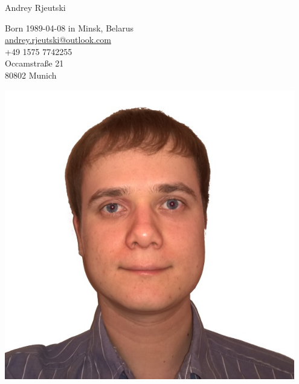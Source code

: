 \documentclass[a4paper,11pt]{article}
\makeatletter
\newcommand{\myemail}{andrey.rjeutski@outlook.com}
\newcommand{\minsk}{Minsk, Belarus}
\makeatother
\begin{document}
  \begin{minipage}{0.69\textwidth}
    \begin{centering}
      {\Huge Andrey Rjeutski}

      Born 1989-04-08 in \minsk\\
      \href{mailto:\myemail}{\myemail}\\
      +49 1575 7742255\\
      Occamstraße 21\\ 
      80802 Munich
      
    \end{centering}
  \end{minipage}
  \begin{minipage}{0.3\textwidth}
    \includegraphics[width=0.95\textwidth]{photo}
  \end{minipage}
  
\end{document}
